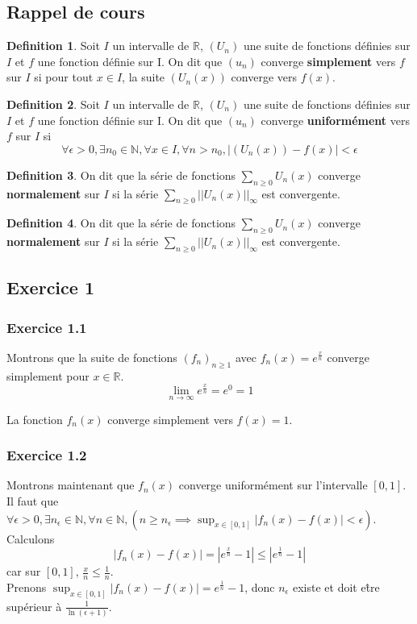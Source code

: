 \documentclass[]{book}
\theoremstyle{definition}
\newtheorem{defn}{Definition}
\newcommand{\bb}[1]{\mathbb{#1}}
\newcommand{\R}{\bb{R}}
\newcommand{\N}{\bb{N}}
\begin{document}
\subsection*{Rappel de cours}
\begin{defn}
Soit $I$ un intervalle de $\R$,  $(U_n)$ une suite de fonctions d\'efinies sur $I$ et $f$ une fonction d\'efinie sur I.
On dit que $(u_n)$ converge \textbf{simplement} vers $f$ sur $I$ si pour tout $x \in I$, la suite $(U_n(x))$ converge vers $f(x)$.
\end{defn}

\begin{defn}
Soit $I$ un intervalle de $\R$,  $(U_n)$ une suite de fonctions d\'efinies sur $I$ et $f$ une fonction d\'efinie sur I.
On dit que $(u_n)$ converge \textbf{uniform\'ement} vers $f$ sur $I$ si
$$\forall \epsilon > 0, \exists n_0 \in \N, \forall x \in I, \forall n > n_0, |(U_n(x)) - f(x)| < \epsilon$$
\end{defn}

\begin{defn}
On dit que la s\'erie de fonctions $\sum_{n\geq0}U_n(x)$ converge \textbf{normalement} sur  $I$ si la s\'erie $\sum_{n\geq0}||U_n(x)||_{\infty}$ est convergente.
 \end{defn}

\begin{defn}
On dit que la s\'erie de fonctions $\sum_{n\geq0}U_n(x)$ converge \textbf{normalement} sur  $I$ si la s\'erie $\sum_{n\geq0}||U_n(x)||_{\infty}$ est convergente.
\end{defn}


\newpage
\subsection*{Exercice 1}
\subsubsection*{Exercice 1.1}
Montrons que la suite de fonctions $(f_n)_{n \ge 1}$ avec $f_n(x)=e^{\frac{x}{n}}$ converge simplement pour $x \in \R$.
$$\lim_{n \to \infty}e^{\frac{x}{n}} = e^{0} = 1$$

La fonction $f_n(x)$ converge simplement vers $f(x) = 1$. 

\subsubsection*{Exercice 1.2}
Montrons maintenant que $f_n(x)$ converge uniform\'ement sur l'intervalle $[0,1]$. Il faut que $\forall \epsilon > 0, \exists n_{\epsilon} \in \N, \forall n \in \N, (n \geq n_{\epsilon} \implies \sup_{x \in [0,1]} |f_n(x)-f(x)| < \epsilon)$.
Calculons 
$$|f_n(x)-f(x)| = \left|e^{\frac{x}{n}} -1 \right| \leq \left|e^{\frac{1}{n}} -1 \right|$$
car sur $[0,1]$, $\frac{x}{n} \leq \frac{1}{n}$. \\ 
Prenons $\sup_{x \in [0,1]} |f_n(x)-f(x)| = e^{\frac{1}{n}}-1$, donc $n_{\epsilon}$ existe et doit e\^tre sup\'erieur \`a $\frac{1}{\ln(\epsilon+1)}$.
\end{document}
